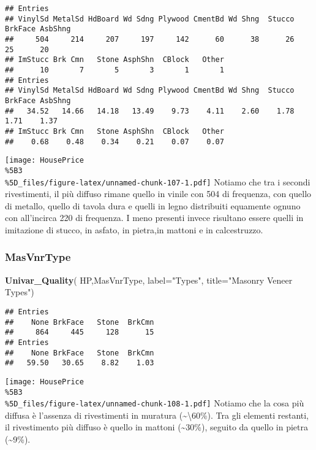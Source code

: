 \documentclass[
]{article}
\newenvironment{Shaded}{\begin{snugshade}}{\end{snugshade}}
\newcommand{\AttributeTok}[1]{\textcolor[rgb]{0.13,0.29,0.53}{#1}}
\newcommand{\FunctionTok}[1]{\textcolor[rgb]{0.13,0.29,0.53}{\textbf{#1}}}
\newcommand{\NormalTok}[1]{#1}
\newcommand{\StringTok}[1]{\textcolor[rgb]{0.31,0.60,0.02}{#1}}
\begin{document}
\begin{verbatim}
## Entries
## VinylSd MetalSd HdBoard Wd Sdng Plywood CmentBd Wd Shng  Stucco BrkFace AsbShng 
##     504     214     207     197     142      60      38      26      25      20 
## ImStucc Brk Cmn   Stone AsphShn  CBlock   Other 
##      10       7       5       3       1       1 
## Entries
## VinylSd MetalSd HdBoard Wd Sdng Plywood CmentBd Wd Shng  Stucco BrkFace AsbShng 
##   34.52   14.66   14.18   13.49    9.73    4.11    2.60    1.78    1.71    1.37 
## ImStucc Brk Cmn   Stone AsphShn  CBlock   Other 
##    0.68    0.48    0.34    0.21    0.07    0.07
\end{verbatim}

\texttt{[image: HousePrice\\\%5B3\\\%5D\_files/figure-latex/unnamed-chunk-107-1.pdf]}
Notiamo che tra i secondi rivestimenti, il più diffuso rimane quello in
vinile con 504 di frequenza, con quello di metallo, quello di tavola
dura e quelli in legno distribuiti equamente ognuno con all'incirca 220
di frequenza. I meno presenti invece risultano essere quelli in
imitazione di stucco, in asfato, in pietra,in mattoni e in calcestruzzo.

\subsubsection{MasVnrType}\label{masvnrtype}

\begin{Shaded}
\begin{Highlighting}[]
\FunctionTok{Univar\_Quality}\NormalTok{(}
\NormalTok{  HP,MasVnrType,}
  \AttributeTok{label=}\StringTok{"Types"}\NormalTok{,}
  \AttributeTok{title=}\StringTok{"Masonry Veneer Types"}\NormalTok{)}
\end{Highlighting}
\end{Shaded}

\begin{verbatim}
## Entries
##    None BrkFace   Stone  BrkCmn 
##     864     445     128      15 
## Entries
##    None BrkFace   Stone  BrkCmn 
##   59.50   30.65    8.82    1.03
\end{verbatim}

\texttt{[image: HousePrice\\\%5B3\\\%5D\_files/figure-latex/unnamed-chunk-108-1.pdf]}
Notiamo che la cosa più diffusa è l'assenza di rivestimenti in muratura
(\textasciitilde\textbackslash60\%). Tra gli elementi restanti, il
rivestimento più diffuso è quello in mattoni (\textasciitilde30\%),
seguito da quello in pietra (\textasciitilde9\%).
\end{document}
